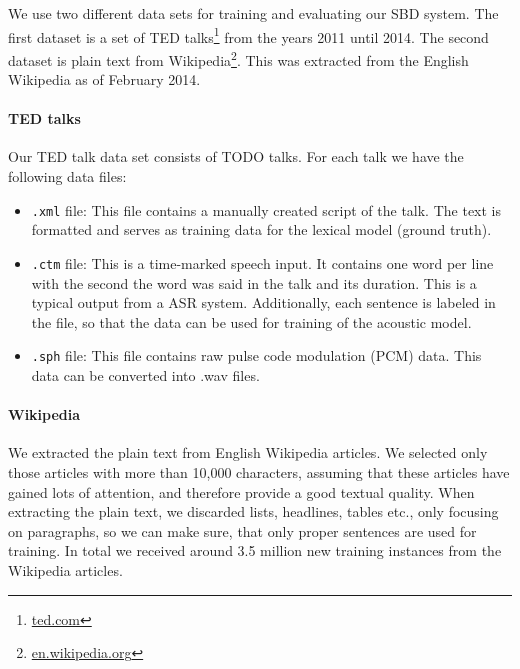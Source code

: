 
We use two different data sets for training and evaluating our SBD system.
The first dataset is a set of TED talks\footnote{\url{ted.com}} from the years 2011 until 2014.
The second dataset is plain text from Wikipedia\footnote{\url{en.wikipedia.org}}.
This was extracted from the English Wikipedia as of February 2014.

\paragraph{TED talks}
Our TED talk data set consists of TODO talks. For each talk we have the following data files:
\begin{itemize}
	\item \texttt{.xml} file: This file contains a manually created script of the talk.
	The text is formatted and serves as training data for the lexical model (ground truth).
	\item \texttt{.ctm} file: This is a time-marked speech input.
	It contains one word per line with the second the word was said in the talk and its duration.
    This is a typical output from a ASR system.
	Additionally, each sentence is labeled in the file, so that the data can be used for training of the acoustic model.
	\item \texttt{.sph} file: This file contains raw pulse code modulation (PCM) data.
	This data can be converted into .wav files.
\end{itemize}

\paragraph{Wikipedia}
We extracted the plain text from English Wikipedia articles.
We selected only those articles with more than 10,000 characters, assuming that these articles have gained lots of attention, and therefore provide a good textual quality.
When extracting the plain text, we discarded lists, headlines, tables etc., only focusing on paragraphs, so we can make sure, that only proper sentences are used for training.
In total we received around 3.5 million new training instances from the Wikipedia articles.

